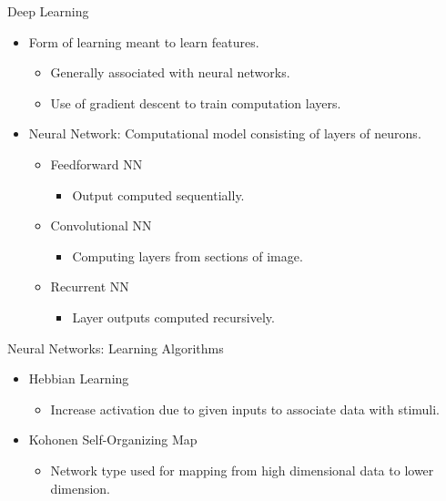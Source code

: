 \documentclass[11pt]{beamer}
\begin{document}
\begin{frame}{Deep Learning}
\begin{itemize}
    \item Form of learning meant to learn features.
    \begin{itemize}
        \item Generally associated with neural networks.
        \item Use of gradient descent to train computation layers.
    \end{itemize}
    \item Neural Network: Computational model consisting of layers of neurons.
    \begin{itemize}
        \item Feedforward NN
        \begin{itemize} \item Output computed sequentially. \end{itemize}
        \item Convolutional NN
        \begin{itemize} \item Computing layers from sections of image. \end{itemize}
        \item Recurrent NN
        \begin{itemize} \item Layer outputs computed recursively. \end{itemize}
    \end{itemize}
\end{itemize}
\end{frame}

\begin{frame}{Neural Networks: Learning Algorithms}
\begin{itemize}

    \begin{itemize}
        \item Using gradient descent across layers to minimize a loss function.
    \end{itemize}

    \item Hebbian Learning
    \begin{itemize}
        \item Increase activation due to given inputs to associate data with stimuli.
    \end{itemize}

    \item Kohonen Self-Organizing Map
    \begin{itemize}
        \item Network type used for mapping from high dimensional data to lower dimension.
    \end{itemize}

\end{itemize}
\end{frame}
\end{document}
